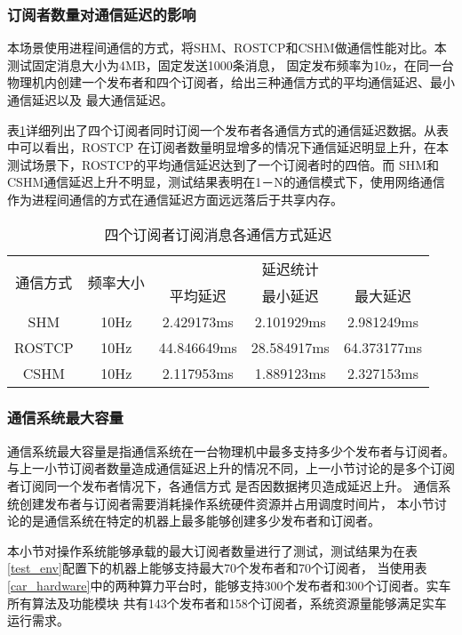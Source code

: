 \subsubsection{订阅者数量对通信延迟的影响}
本场景使用进程间通信的方式，将SHM、ROSTCP和CSHM做通信性能对比。本测试固定消息大小为4MB，固定发送1000条消息，
固定发布频率为10z，在同一台物理机内创建一个发布者和四个订阅者，给出三种通信方式的平均通信延迟、最小通信延迟以及
最大通信延迟。

表\ref{multi_subscribers}详细列出了四个订阅者同时订阅一个发布者各通信方式的通信延迟数据。从表中可以看出，ROSTCP
在订阅者数量明显增多的情况下通信延迟明显上升，在本测试场景下，ROSTCP的平均通信延迟达到了一个订阅者时的四倍。而
SHM和CSHM通信延迟上升不明显，测试结果表明在1－N的通信模式下，使用网络通信作为进程间通信的方式在通信延迟方面远远落后于共享内存。
\begin{table}[htb]
  \centering\small
  \caption{四个订阅者订阅消息各通信方式延迟}
  \renewcommand\arraystretch{1.2}
  \label{multi_subscribers}
  \begin{tabular}{ccccc}
    \toprule
    \multirow{2}{*}{通信方式} & \multirow{2}{*}{频率大小} & \multicolumn{3}{c}{延迟统计}\\
    \cline{3-5}
     & & 平均延迟 & 最小延迟 & 最大延迟\\
    \midrule
    SHM & 10Hz & 2.429173ms & 2.101929ms & 2.981249ms\\ 
    \hline
    ROSTCP & 10Hz & 44.846649ms & 28.584917ms & 64.373177ms\\ 
    \hline
    CSHM & 10Hz & 2.117953ms & 1.889123ms & 2.327153ms\\ 
    \bottomrule
  \end{tabular}
\end{table}

\subsubsection{通信系统最大容量}
通信系统最大容量是指通信系统在一台物理机中最多支持多少个发布者与订阅者。
与上一小节订阅者数量造成通信延迟上升的情况不同，上一小节讨论的是多个订阅者订阅同一个发布者情况下，各通信方式
是否因数据拷贝造成延迟上升。
通信系统创建发布者与订阅者需要消耗操作系统硬件资源并占用调度时间片，
本小节讨论的是通信系统在特定的机器上最多能够创建多少发布者和订阅者。


本小节对操作系统能够承载的最大订阅者数量进行了测试，测试结果为在表\ref{test_env}配置下的机器上能够支持最大70个发布者和70个订阅者，
当使用表\ref{car_hardware}中的两种算力平台时，能够支持300个发布者和300个订阅者。实车所有算法及功能模块
共有143个发布者和158个订阅者，系统资源量能够满足实车运行需求。

